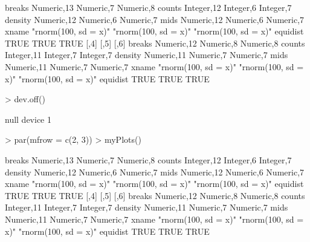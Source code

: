 \documentclass[12pt,letterpaper,final]{article}
\begin{document}
\begin{Schunk}
\begin{Soutput}
         [,1]                 [,2]                 [,3]                
breaks   Numeric,13           Numeric,7            Numeric,8           
counts   Integer,12           Integer,6            Integer,7           
density  Numeric,12           Numeric,6            Numeric,7           
mids     Numeric,12           Numeric,6            Numeric,7           
xname    "rnorm(100, sd = x)" "rnorm(100, sd = x)" "rnorm(100, sd = x)"
equidist TRUE                 TRUE                 TRUE                
         [,4]                 [,5]                 [,6]                
breaks   Numeric,12           Numeric,8            Numeric,8           
counts   Integer,11           Integer,7            Integer,7           
density  Numeric,11           Numeric,7            Numeric,7           
mids     Numeric,11           Numeric,7            Numeric,7           
xname    "rnorm(100, sd = x)" "rnorm(100, sd = x)" "rnorm(100, sd = x)"
equidist TRUE                 TRUE                 TRUE                
\end{Soutput}
\begin{Sinput}
> dev.off()
\end{Sinput}
\begin{Soutput}
null device 
          1 
\end{Soutput}
\begin{Sinput}
> par(mfrow = c(2, 3))
> myPlots()
\end{Sinput}
\begin{Soutput}
         [,1]                 [,2]                 [,3]                
breaks   Numeric,13           Numeric,7            Numeric,8           
counts   Integer,12           Integer,6            Integer,7           
density  Numeric,12           Numeric,6            Numeric,7           
mids     Numeric,12           Numeric,6            Numeric,7           
xname    "rnorm(100, sd = x)" "rnorm(100, sd = x)" "rnorm(100, sd = x)"
equidist TRUE                 TRUE                 TRUE                
         [,4]                 [,5]                 [,6]                
breaks   Numeric,12           Numeric,8            Numeric,8           
counts   Integer,11           Integer,7            Integer,7           
density  Numeric,11           Numeric,7            Numeric,7           
mids     Numeric,11           Numeric,7            Numeric,7           
xname    "rnorm(100, sd = x)" "rnorm(100, sd = x)" "rnorm(100, sd = x)"
equidist TRUE                 TRUE                 TRUE                
\end{Soutput}
\begin{Sinput}

\end{Sinput}
\end{Schunk}
\end{document}
